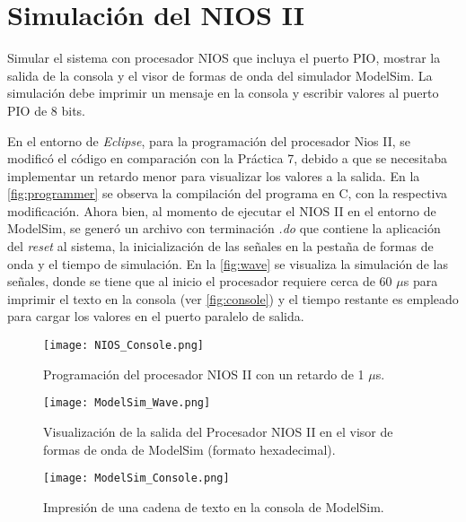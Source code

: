 \section{Simulación del NIOS II \label{sec:s1}}

\begin{center}
	\begin{minipage}{12cm}
		\begin{tcolorbox}[title=Actividad 1]
			Simular el sistema con procesador NIOS que incluya el puerto PIO, mostrar la salida de la consola y el visor de formas de onda del simulador ModelSim. La simulación debe imprimir un mensaje en la consola y escribir valores al puerto PIO de 8 bits.
		\end{tcolorbox}	
	\end{minipage}
\end{center}

En el entorno de \textit{Eclipse}, para la programación del procesador Nios II, se modificó el código en comparación con la Práctica 7, debido a que se necesitaba implementar un retardo menor para visualizar los valores a la salida. En la \autoref{fig:programmer} se observa la compilación del programa en C, con la respectiva modificación. Ahora bien, al momento de ejecutar el NIOS II en el entorno de ModelSim, se generó un archivo con terminación \textit{.do} que contiene la aplicación del \textit{reset} al sistema, la inicialización de las señales en la pestaña de formas de onda y el tiempo de simulación. En la \autoref{fig:wave} se visualiza la simulación de las señales, donde se tiene que al inicio el procesador requiere cerca de 60 $\mu$s para imprimir el texto en la consola (ver \autoref{fig:console}) y el tiempo restante es empleado para cargar los valores en el puerto paralelo de salida.

\begin{figure}[ht]
	\centering
	\texttt{[image: NIOS\_Console.png]}
	\caption{Programación del procesador NIOS II con un retardo de 1 $\mu$s. \label{fig:programmer}}
\end{figure}

\begin{figure}[ht]
	\centering
	\texttt{[image: ModelSim\_Wave.png]}
	\caption{Visualización de la salida del Procesador NIOS II en el visor de formas de onda de ModelSim (formato hexadecimal). \label{fig:wave}}
\end{figure}

\begin{figure}[ht]
	\centering
	\texttt{[image: ModelSim\_Console.png]}
	\caption{Impresión de una cadena de texto en la consola de ModelSim. \label{fig:console}}
\end{figure}